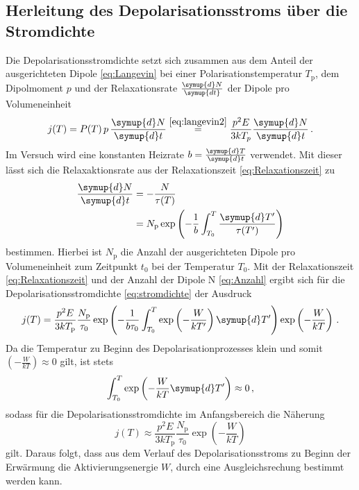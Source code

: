 \subsection{Herleitung des Depolarisationsstroms über die Stromdichte}
\label{sec:stromdichte}
Die Depolarisationsstromdichte setzt sich zusammen aus dem Anteil der ausgerichteten Dipole \eqref{eq:Langevin} bei einer Polarisationstemperatur $T_\text{p}$, dem Dipolmoment $p$ und der Relaxationsrate $\frac{\symup{d}N}{\symup{dt}}$ der Dipole pro Volumeneinheit
\begin{equation}
    j(T)=P(T)\, p \,\frac{\symup{d}N}{\symup{d}t} \stackrel{ \eqref{eq:langevin2} }{=} \frac{p^2 E}{3kT_p}\frac{\symup{d}N}{\symup{d}t} \, .
    \label{eq:stromdichte}
\end{equation}
Im Versuch wird eine konstanten Heizrate $b = \frac{\symup{d}T}{\symup{d}t}$ verwendet.
Mit dieser lässt sich die Relaxaktionsrate aus der Relaxationszeit \eqref{eq:Relaxationszeit} zu
\begin{align}
    \frac{\symup{d}N}{\symup{d}t} & = -\frac{N}{\tau(T)}\notag \\
    & = N_\text{p}\exp \left (-\frac{1}{b}\int_{T_0}^T \frac{\symup{d}T'}{\tau(T')} \right )
    \label{eq:Anzahl}
\end{align}
bestimmen.
Hierbei ist $N_\text{p}$ die Anzahl der ausgerichteten Dipole pro Volumeneinheit zum Zeitpunkt $t_0$ bei der Temperatur $T_0$.
Mit der Relaxationszeit \eqref{eq:Relaxationszeit} und der Anzahl der Dipole N \eqref{eq:Anzahl} ergibt sich für die Depolarisationsstromdichte \eqref{eq:stromdichte} der Ausdruck
\begin{equation}\label{eq:stromdichte2}
    j(T)= \frac{p^2E}{3kT_\text{p}}\frac{N_\text{p}}{\tau_0} \exp \left (-\frac{1}{b\tau_0}\int_{T_0}^T \exp \left (-\frac{W}{kT'} \right ) \symup{d}T'  \right ) \exp \left (-\frac{W}{kT} \right )\, .
\end{equation}
Da die Temperatur zu Beginn des Depolarisationprozesses klein und somit $\left (-\frac{W}{kT} \right )\approx 0$ gilt, ist stets
\begin{equation*}
    \int_{T_0}^T \exp \left (-\frac{W}{kT}\symup{d}T' \right ) \approx 0\, ,
\end{equation*}
sodass für die Depolarisationsstromdichte im Anfangsbereich die Näherung
\begin{equation}
    j(T) \approx \frac{p^2 E}{3kT_\text{p}}\frac{N_\text{p}}{\tau_0} \exp \left (-\frac{W}{kT} \right )
    \label{eq:anlauf}
\end{equation}
gilt.
Daraus folgt, dass aus dem Verlauf des Depolarisationsstroms zu Beginn der Erwärmung die Aktivierungsenergie $W$, durch eine Ausgleichsrechung bestimmt werden kann.